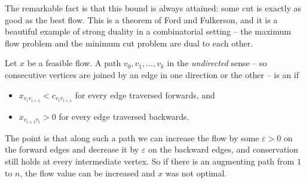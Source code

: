 The remarkable fact is that this bound is always attained: some cut is exactly as good as the best flow. This is a theorem of Ford and Fulkerson, and it is a beautiful example of strong duality in a combinatorial setting -- the maximum flow problem and the minimum cut problem are dual to each other.

\begin{definition}
    Let $x$ be a feasible flow. A path $v_0, v_1, \dots, v_k$ in the \emph{undirected} sense -- so consecutive vertices are joined by an edge in one direction or the other -- is an  if
    \begin{itemize}
        \item $x_{v_iv_{i+1}} < c_{v_iv_{i+1}}$ for every edge traversed forwards, and
        \item $x_{v_{i+1}v_i} > 0$ for every edge traversed backwards.
    \end{itemize}
\end{definition}

The point is that along such a path we can increase the flow by some $\varepsilon > 0$ on the forward edges and decrease it by $\varepsilon$ on the backward edges, and conservation still holds at every intermediate vertex. So if there is an augmenting path from $1$ to $n$, the flow value can be increased and $x$ was not optimal.

\begin{center}
\end{center}

